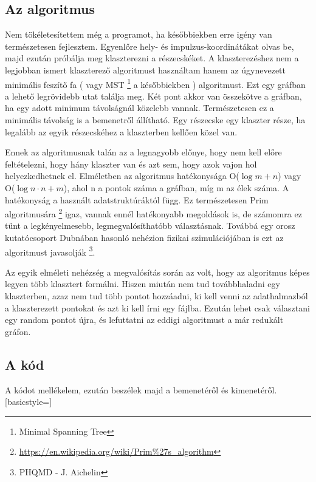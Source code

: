 \documentclass[a4paper,12pt]{article}
\begin{document}
\subsection{ Az algoritmus}
\par Nem tökéletesítettem még a programot, ha későbbiekben erre igény van természetesen fejlesztem. Egyenlőre hely- és impulzus-koordinátákat
olvas be, majd ezután próbálja meg klaszterezni a részecskéket. A klaszterezéshez nem a legjobban ismert klaszterező algoritmust
használtam hanem az úgynevezett minimális feszítő fa ( vagy MST \footnote{Minimal Spanning Tree} a későbbiekben ) algoritmust. Ezt egy 
gráfban a lehető legrövidebb utat találja meg. Két pont akkor van összekötve a gráfban, ha egy adott minimum távolságnál közelebb vannak.
Természetesen ez a minimális távolság is a bemenetről állítható. Egy részecske egy klaszter része, ha legalább az egyik részecskéhez a
klaszterben kellően közel van. 
\par Ennek az algoritmusnak talán az a legnagyobb előnye, hogy nem kell előre feltételezni, hogy hány klaszter van és azt sem, hogy 
azok vajon hol helyezkedhetnek el. Elméletben az algoritmus hatékonysága O($\log{m} + n$) vagy O($\log{n}\cdot n + m$), ahol n a pontok
száma a gráfban, míg m az élek száma. A hatékonyság a használt adatstruktúráktól függ. Ez természetesen Prim algoritmusára \footnote{\url{https://en.wikipedia.org/wiki/Prim\%27s_algorithm}}
igaz, vannak ennél hatékonyabb megoldások is, de számomra ez tűnt a legkényelmesebb, legmegvalósíthatóbb választásnak. Továbbá egy orosz 
kutatócsoport Dubnában hasonló nehézion fizikai szimulációjában is ezt az algoritmust javasolják \footnote{PHQMD - J. Aichelin}.
\par  Az egyik elméleti nehézség a megvalósítás során az volt, hogy az algoritmus képes legyen több klasztert formálni. Hiszen miután 
nem tud továbbhaladni egy klaszterben, azaz nem tud több pontot hozzáadni, ki kell venni az adathalmazból a klaszterezett pontokat és 
azt ki kell írni egy fájlba. Ezután lehet csak választani egy random pontot újra, és lefuttatni az eddigi algoritmust a már redukált gráfon.
\subsection{ A kód}
\par A kódot mellékelem, ezután beszélek majd a bemenetéről és kimenetéről.
[basicstyle=\linespread{1.12358}]
\end{document}
